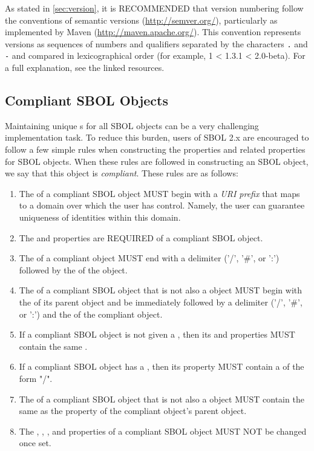 As stated in \ref{sec:version},  it is RECOMMENDED that version numbering follow
the conventions of semantic versions (\url{http://semver.org/}), particularly as implemented by Maven (\url{http://maven.apache.org/}).
This convention represents versions as sequences of numbers and qualifiers separated by the characters {\tt .} and {\tt -} and compared in lexicographical order (for example, 1 < 1.3.1 < 2.0-beta).  For a full explanation, see the linked resources.

\subsection{Compliant SBOL Objects}
\label{sec:compliant}

Maintaining unique  s for all SBOL objects can be a very challenging implementation task.  To reduce this burden, users of SBOL 2.x are encouraged to follow a few simple rules when constructing the  properties and related properties for SBOL objects.  When these rules are followed in constructing an SBOL object, we say that this object is \emph{compliant}. These rules are as follows:
\begin{enumerate}
\item The  of a compliant SBOL object MUST begin with a \emph{URI prefix} that maps to a domain over which the user has control. Namely, the user can guarantee uniqueness of identities within this domain.
\item The  and  properties are REQUIRED of a compliant SBOL object.
\item The  of a compliant  object MUST end with a delimiter ('/', '\#', or ':') followed by the  of the object. 
\item The  of a compliant SBOL object that is not also a  object MUST begin with the  of its parent object and be immediately followed by a delimiter ('/', '\#', or ':') and the  of the compliant object.
\item If a compliant SBOL object is not given a , then its  and  properties MUST contain the same .
\item If a compliant SBOL object has a , then its  property MUST contain a  of the form  "/".
\item The  of a compliant SBOL object that is not also a  object MUST contain the same  as the  property of the compliant object's parent object.
\item The , , , and  properties of a compliant SBOL object MUST NOT be changed once set.
\end{enumerate}

